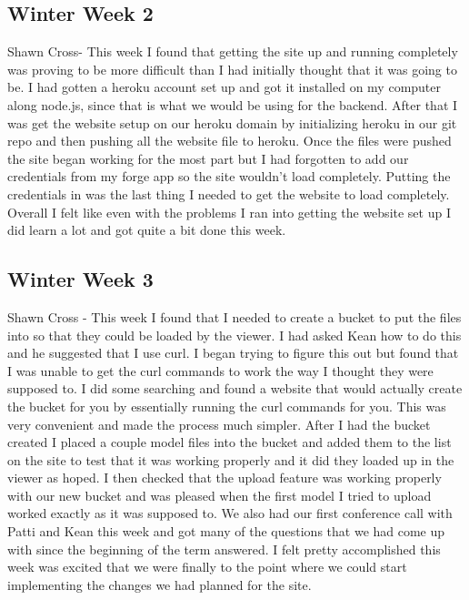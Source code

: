 \documentclass[10pt,draftclsnofoot,onecolumn]{IEEEtran}
\begin{document}
\subsection{Winter Week 2}
Shawn Cross- This week I found that getting the site up and running completely was proving to be more difficult than I had initially thought that it was going to be. I had gotten a heroku account set up and got it installed on my computer along node.js, since that is what we would be using for the backend. After that I was get the website setup on our heroku domain by initializing heroku in our git repo and then pushing all the website file to heroku. Once the files were pushed the site began working for the most part but I had forgotten to add our credentials from my forge app so the site wouldn't load completely. Putting the credentials in was the last thing I needed to get the website to load completely. Overall I felt like even with the problems I ran into getting the website set up I did learn a lot and got quite a bit done this week. 
\subsection{Winter Week 3}
Shawn Cross - This week I found that I needed to create a bucket to put the files into so that they could be loaded by the viewer. I had asked Kean how to do this and he suggested that I use curl. I began trying to figure this out but found that I was unable to get the curl commands to work the way I thought they were supposed to. I did some searching and found a website that would actually create the bucket for you by essentially running the curl commands for you. This was very convenient and made the process much simpler. After I had the bucket created I placed a couple model files into the bucket and added them to the list on the site to test that it was working properly and it did they loaded up in the viewer as hoped. I then checked that the upload feature was working properly with our new bucket and was pleased when the first model I tried to upload worked exactly as it was supposed to. We also had our first conference call with Patti and Kean this week and got many of the questions that we had come up with since the beginning of the term answered. I felt pretty accomplished this week was excited that we were finally to the point where we could start implementing the changes we had planned for the site.
\end{document}

